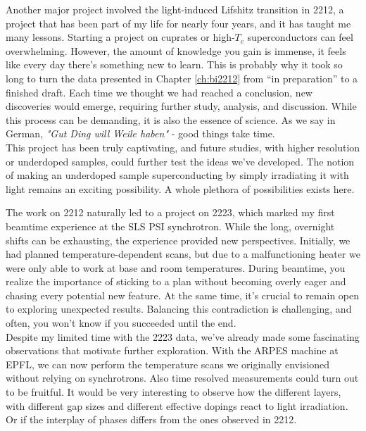 Another major project involved the light-induced Lifshitz transition in 2212, a project that has been part of my life for nearly four years, and it has taught me many lessons.
Starting a project on cuprates or high-$T_c$ superconductors can feel overwhelming.
However, the amount of knowledge you gain is immense, it feels like every day there’s something new to learn.
This is probably why it took so long to turn the data presented in Chapter \ref{ch:bi2212} from “in preparation” to a finished draft.
Each time we thought we had reached a conclusion, new discoveries would emerge, requiring further study, analysis, and discussion.
While this process can be demanding, it is also the essence of science.
As we say in German, \textit{"Gut Ding will Weile haben"} - good things take time.\\

This project has been truly captivating, and future studies, with higher resolution or underdoped samples, could further test the ideas we’ve developed.
The notion of making an underdoped sample superconducting by simply irradiating it with light remains an exciting possibility.
A whole plethora of possibilities exists here.\hfill\break

The work on 2212 naturally led to a project on 2223, which marked my first beamtime experience at the SLS PSI synchrotron.
While the long, overnight shifts can be exhausting, the experience provided new perspectives.
Initially, we had planned temperature-dependent scans, but due to a malfunctioning heater we were only able to work at base and room temperatures.
During beamtime, you realize the importance of sticking to a plan without becoming overly eager and chasing every potential new feature.
At the same time, it's crucial to remain open to exploring unexpected results.
Balancing this contradiction is challenging, and often, you won’t know if you succeeded until the end.\\
Despite my limited time with the 2223 data, we’ve already made some fascinating observations that motivate further exploration.
With the ARPES machine at EPFL, we can now perform the temperature scans we originally envisioned without relying on synchrotrons.
Also time resolved measurements could turn out to be fruitful.
It would be very interesting to observe how the different layers, with different gap sizes and different effective dopings react to light irradiation.
Or if the interplay of phases differs from the ones observed in 2212. \hfill\break


